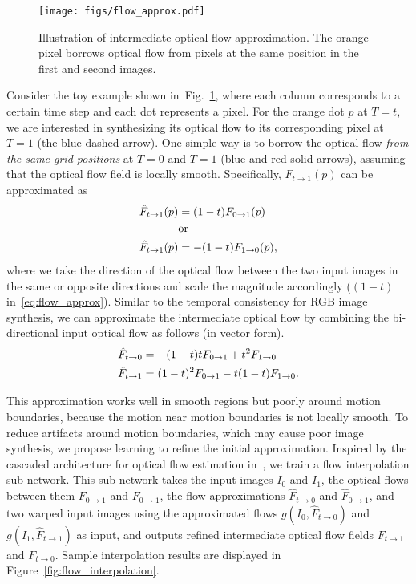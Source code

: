 \documentclass[10pt,twocolumn,letterpaper]{article}
\newcommand{\figref}[1]{Fig.~\ref{#1}}
\begin{document}
\begin{figure}[t]
\centering
\texttt{[image: figs/flow\_approx.pdf]}
\caption{Illustration of intermediate optical flow approximation. The orange pixel borrows optical flow from pixels at the same position in the first and second images.}
\label{fig:flow_approx_illustration}
\end{figure}

Consider the toy example shown in~\figref{fig:flow_approx_illustration}, where each column corresponds to a certain time step and each dot represents a pixel. For the orange dot $p$ at $T=t$, we are interested in synthesizing its optical flow to its corresponding pixel at $T=1$ (the blue dashed arrow). One simple way is to borrow the optical flow \emph{from the same grid positions} at $T=0$ and $T=1$ (blue and red solid arrows), assuming that the optical flow field is locally smooth. Specifically, $F_{t\rightarrow1}(p)$ can be approximated as
\begin{align}
\hat{F}_{t\rightarrow1}(p) &= (1-t)F_{0\rightarrow1}(p)\\
&\mbox{or}\notag\\
\hat{F}_{t\rightarrow1}(p) &= -(1-t)F_{1\rightarrow0}(p),
\label{eq:flow_approx}
\end{align}
where we take the direction of the optical flow between the two input images in the same or opposite directions and scale the magnitude accordingly ($(1-t)$ in~\eqref{eq:flow_approx}). Similar to the temporal consistency for RGB image synthesis, we can approximate the intermediate optical flow by combining the bi-directional input optical flow as follows (in vector form).
\begin{align}
\hat{F}_{t\rightarrow 0} &= -(1-t)tF_{0\rightarrow 1} + t^2F_{1\rightarrow 0} \notag\\
\hat{F}_{t\rightarrow 1} &= (1-t)^2F_{0\rightarrow 1} -t(1-t)F_{1\rightarrow 0}.
\label{eq:flow_approx_bidirect}
\end{align}

This approximation works well in smooth regions but poorly around motion boundaries, because the motion near motion boundaries is not locally smooth.  To reduce artifacts around motion boundaries, which may cause poor image synthesis, we propose learning to refine the initial approximation. Inspired by the cascaded architecture for optical flow estimation in~\cite{ilg16flownet2}, we train a flow interpolation sub-network. This sub-network takes the input images $I_0$ and $I_1$, the optical flows between them $F_{0\rightarrow1}$ and $F_{0\rightarrow1}$, the flow approximations $\hat{F}_{t\rightarrow 0}$ and $\hat{F}_{0\rightarrow 1}$, and two warped input images using the approximated flows $g(I_0, \hat{F}_{t\rightarrow0})$ and $g(I_1, \hat{F}_{t\rightarrow1})$ as input, and outputs refined intermediate optical flow fields $F_{t\rightarrow1}$ and $F_{t\rightarrow0}$. Sample interpolation results are displayed in Figure~\ref{fig:flow_interpolation}.
\end{document}
